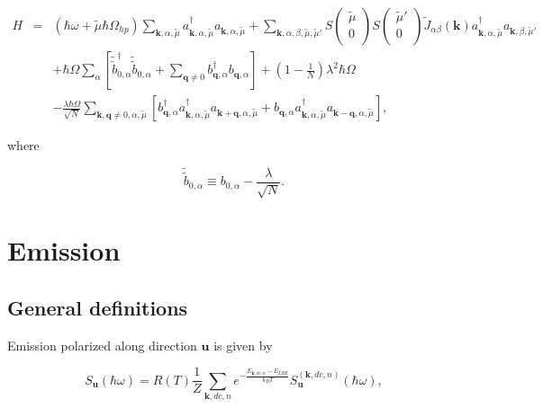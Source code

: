 \documentclass[pt12]{article}
\newcommand{\beq}{\begin{equation}}
\newcommand{\eeq}{\end{equation}}
\newcommand{\bfk}{\mathbf{k}}
\newcommand{\bfq}{\mathbf{q}}
\newcommand{\bfu}{\mathbf{u}}
\newcommand{\tmu}{\tilde{\mu}}
\begin{document}
\begin{eqnarray}\label{H_FT_q0}
H&=&\left(\hbar\omega+\tmu\hbar\Omega_{hp}\right)\sum_{\bfk,\alpha,\tmu}
a^\dagger_{\bfk,\alpha,\tmu}a_{\bfk,\alpha,\tmu}
+\sum_{\bfk,\alpha,\beta,\tmu,\tmu'} S\left(
                                \begin{array}{c}
                                    \tmu \\
                                    0 \\
                                  \end{array}
                                \right)
S\left(
                                \begin{array}{c}
                                    \tmu' \\
                                    0 \\
                                  \end{array}
                                \right)
\tilde{J}_{\alpha\beta}(\bfk)
a^\dagger_{\bfk,\alpha,\tmu}a_{\bfk,\beta,\tmu'}\\
\nonumber &&+\hbar\Omega\sum_{\alpha}\left[
\tilde{\tilde{b}}^\dagger_{0,\alpha}\tilde{\tilde{b}}_{0,\alpha}+\sum_{\bfq\neq
0}
b^\dagger_{\bfq,\alpha}b_{\bfq,\alpha}\right]+\left(1-\frac{1}{N}\right)\lambda^2\hbar\Omega
\\
\nonumber && -\frac{\lambda\hbar\Omega}{\sqrt{N}}\sum_{\bfk,\bfq\neq
0,\alpha,\tmu} \left[
b^\dagger_{\bfq,\alpha}a^\dagger_{\bfk,\alpha,\tmu}a_{\bfk+\bfq,\alpha,\tmu}
+
b_{\bfq,\alpha}a^\dagger_{\bfk,\alpha,\tmu}a_{\bfk-\bfq,\alpha,\tmu}
\right],
\end{eqnarray}

where

\begin{equation}\label{b0}
\tilde{\tilde{b}}_{0,\alpha} \equiv b_{0,\alpha}-
\frac{\lambda}{\sqrt{N}}.
\end{equation}


\section{Emission}

\subsection{General definitions}

Emission polarized along direction $\bfu$ is given by

\beq S_\bfu(\hbar\omega)=R(T)
\frac{1}{Z}\sum_{\bfk,dc,n}e^{-\frac{E_{\bfk,dc,n}-E_{LBE}}{k_BT}}
S_\bfu^{(\bfk,dc,n)}(\hbar\omega), \eeq
\end{document}
